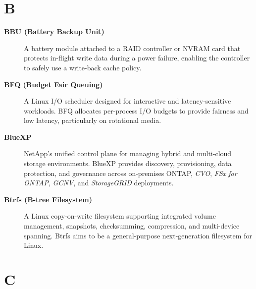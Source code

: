 \section*{B}

\begin{description}

\item[\textbf{BBU (Battery Backup Unit)}]
A battery module attached to a RAID controller or NVRAM card that protects
in-flight write data during a power failure, enabling the controller to
safely use a write-back cache policy.

\item[\textbf{BFQ (Budget Fair Queuing)}]
A Linux I/O scheduler designed for interactive and latency-sensitive
workloads. BFQ allocates per-process I/O budgets to provide fairness and
low latency, particularly on rotational media.

\item[\textbf{BlueXP}]
NetApp's unified control plane for managing hybrid and multi-cloud storage
environments. BlueXP provides discovery, provisioning, data protection, and
governance across on-premises ONTAP, \textit{CVO}, \textit{FSx for ONTAP},
\textit{GCNV}, and \textit{StorageGRID} deployments.

\item[\textbf{Btrfs (B-tree Filesystem)}]
A Linux copy-on-write filesystem supporting integrated volume management,
snapshots, checksumming, compression, and multi-device spanning. Btrfs aims
to be a general-purpose next-generation filesystem for Linux.

\end{description}

\section*{C}

